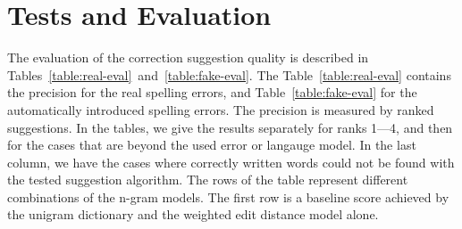 \documentclass{llncs}
\begin{document}
\section{Tests and Evaluation}
\label{sec:evaluation}

The evaluation of the correction suggestion quality is described in
Tables~\ref{table:real-eval}~and~\ref{table:fake-eval}. The
Table~\ref{table:real-eval} contains the precision for the real spelling errors, 
and Table~\ref{table:fake-eval} for the automatically
introduced spelling errors. The precision is measured by ranked suggestions. In
the tables, we give the results separately for ranks 1---4, and then for the cases
that are beyond the used error or langauge model.  In the last column, we have
the cases where correctly written words could not be found with the tested 
suggestion algorithm. The  rows of the table represent different combinations of
the n-gram models. The first row is a baseline score achieved by the unigram
dictionary and the weighted edit distance model alone.
\end{document}
